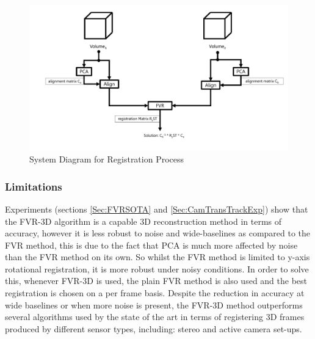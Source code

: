 \begin{figure}[!htb]
\centering
\includegraphics[width=6.0in]{images/methodology/FVR/pipeline8}
\caption{System Diagram for Registration Process}
\label{fig:PIPELINE8}
\end{figure}


\subsubsection{Limitations}

Experiments (sections \ref{Sec:FVRSOTA} and \ref{Sec:CamTransTrackExp}) show that the FVR-3D algorithm is a capable 3D reconstruction method in terms of accuracy, however it is less robust to noise and wide-baselines as compared to the FVR method, this is due to the fact that PCA is much more affected by noise than the FVR method on its own. So whilst the FVR method is limited to y-axis rotational registration, it is more robust under noisy conditions. In order to solve this, whenever FVR-3D is used, the plain FVR method is also used and the best registration is chosen on a per frame basis. Despite the reduction in accuracy at wide baselines or when more noise is present, the FVR-3D method outperforms several algorithms used by the state of the art in terms of registering 3D frames produced by different sensor types, including: stereo and active camera set-ups. \\



